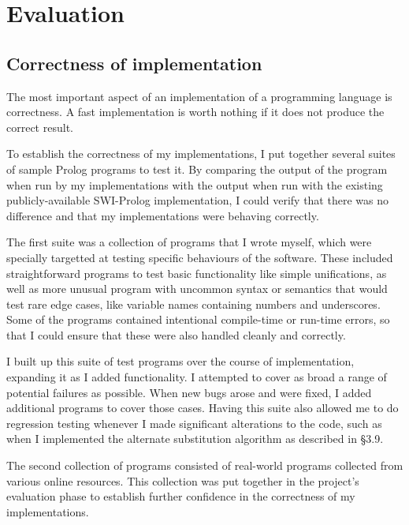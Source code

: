 \documentclass[12pt]{article}
\begin{document}

\newpage

\section{Evaluation}



\subsection{Correctness of implementation}

The most important aspect of an implementation of a programming language is correctness. 
A fast implementation is worth nothing if it does not produce the correct result.

To establish the correctness of my implementations, I put together several suites of sample Prolog programs to test it.
By comparing the output of the program when run by my implementations with the output when run with the existing publicly-available SWI-Prolog implementation, I could verify that there was no difference and that my implementations were behaving correctly.

The first suite was a collection of programs that I wrote myself, which were specially targetted at testing specific behaviours of the software.
These included straightforward programs to test basic functionality like simple unifications, as well as more unusual program with uncommon syntax or semantics that would test rare edge cases, like variable names containing numbers and underscores.
Some of the programs contained intentional compile-time or run-time errors, so that I could ensure that these were also handled cleanly and correctly.

I built up this suite of test programs over the course of implementation, expanding it as I added functionality. 
I attempted to cover as broad a range of potential failures as possible. 
When new bugs arose and were fixed, I added additional programs to cover those cases.
Having this suite also allowed me to do regression testing whenever I made significant alterations to the code, such as when I implemented the alternate substitution algorithm as described in \S3.9.

The second collection of programs consisted of real-world programs collected from various online resources.
This collection was put together in the project's evaluation phase to establish further confidence in the correctness of my implementations.
\end{document}
